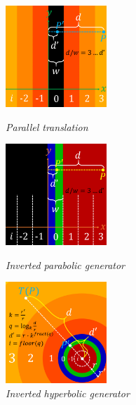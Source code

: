 \begin{figure}[h!tbp]
 \begin{minipage}[t]{0.24\hsize}
  \begin{center}
   \includegraphics[width=1.5in, height=1.5in, keepaspectratio]{./img/application/optimization/translationMod.pdf}
  \end{center}
  \caption{\textit{Parallel translation}}
  \label{fig:translationMod}
 \end{minipage}
 \hspace*{\fill}
 \begin{minipage}[t]{0.24\hsize}
  \begin{center}
   \includegraphics[width=1.5in, height=1.5in, keepaspectratio]{./img/application/optimization/parabolicMod.pdf}
  \end{center}
  \caption{\textit{Inverted parabolic generator}}
  \label{fig:parabolicMod}
 \end{minipage}
 \hspace*{\fill}
 \begin{minipage}[t]{0.24\hsize}
   \begin{center}
    \includegraphics[width=1.5in, height=1.5in, keepaspectratio]{./img/application/optimization/hyperbolicMod.pdf}
   \end{center}
   \caption{\textit{Inverted hyperbolic generator}}

\end{minipage}
\end{figure}
